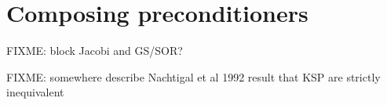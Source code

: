 \section{Composing preconditioners}

FIXME:  block Jacobi and GS/SOR?

FIXME: somewhere describe Nachtigal et al 1992 result that KSP are strictly inequivalent

\begin{comment}
> Hi all,
>
> Is weighted Jacobi available as a preconditioner ? I can't find it in the
> list of preconditioners. If not, what is the rationale between this choice
> ? It is pretty straightforward to code, so if it is not available I can do
> it without problem I guess, but I am just wondering. In the matrix-free
> case where SOR is not available by default, it may be better than pure
> Jacobi, and much easier to parallelize than SOR.
>
>   Timothee Nicolas

I believe what you are looking for is defined by the following options
  -ksp_type richardson
  -ksp_richardson_scale <value>
  -pc_type jacobi

Thanks,
  Dave May
\end{comment}

